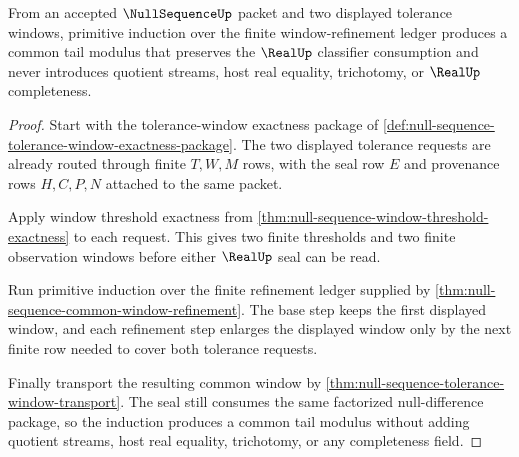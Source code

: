\begin{theorem}
\label{thm:nullsequence-tail-induction-modulus}
From an accepted $\NullSequenceUp$ packet and two displayed tolerance windows, primitive induction over the finite window-refinement ledger produces a common tail modulus that preserves the $\RealUp$ classifier consumption and never introduces quotient streams, host real equality, trichotomy, or $\RealUp$ completeness.
\end{theorem}
\begin{proof}
Start with the tolerance-window exactness package of \autoref{def:null-sequence-tolerance-window-exactness-package}. The two displayed tolerance requests are already routed through finite $T,W,M$ rows, with the seal row $E$ and provenance rows $H,C,P,N$ attached to the same packet.

Apply window threshold exactness from \autoref{thm:null-sequence-window-threshold-exactness} to each request. This gives two finite thresholds and two finite observation windows before either $\RealUp$ seal can be read.

Run primitive induction over the finite refinement ledger supplied by \autoref{thm:null-sequence-common-window-refinement}. The base step keeps the first displayed window, and each refinement step enlarges the displayed window only by the next finite row needed to cover both tolerance requests.

Finally transport the resulting common window by \autoref{thm:null-sequence-tolerance-window-transport}. The seal still consumes the same factorized null-difference package, so the induction produces a common tail modulus without adding quotient streams, host real equality, trichotomy, or any completeness field.
\end{proof}

